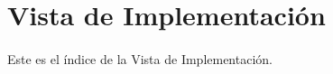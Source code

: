 \newpage
\section{Vista de Implementación}
\paragraph{}
Este es el índice de la Vista de Implementación.
